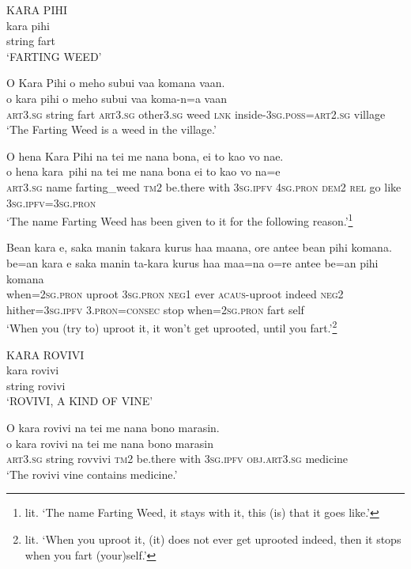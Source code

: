 \ea\label{ex:text7-60}
KARA PIHI\\
\gll kara	pihi\\
     string	fart\\
\glt `FARTING WEED'
\z

\ea\label{ex:text7-61}
O Kara Pihi o meho subui vaa komana vaan.\\
\gll o	kara	pihi	o	meho	subui	vaa	koma-n=a	vaan\\
     \textsc{art}3.\textsc{sg}	string	fart	\textsc{art}3.\textsc{sg}	other3.\textsc{sg}	weed	\textsc{lnk}	inside-3\textsc{sg}.\textsc{poss}=\textsc{art}2.\textsc{sg}	village\\
\glt `The Farting Weed is a weed in the village.'
\z

\ea\label{ex:text7-62}
O hena Kara Pihi na tei me nana bona, ei to kao vo nae.\\
\gll o	hena	kara~pihi	na	tei	me	nana	bona	ei	to	kao	vo	na=e\\
     \textsc{art}3.\textsc{sg}	name	farting\_weed	\textsc{tm}2	be.there	with	3\textsc{sg}.\textsc{ipfv}	4\textsc{sg}.\textsc{pron}	\textsc{dem}2	\textsc{rel}	go	like	3\textsc{sg}.\textsc{ipfv}=3\textsc{sg}.\textsc{pron}\\
\glt `The name Farting Weed has been given to it for the following reason.'\footnote{lit. `The name Farting Weed, it stays with it, this (is) that it goes like.'}
\z

\newpage
\ea\label{ex:text7-63}
Bean kara e, saka manin takara kurus haa maana, ore antee bean pihi komana.\\
\gll be=an	kara	e	saka	manin	ta-kara	kurus	haa	maa=na	o=re	antee	be=an	pihi	komana\\
     when=2\textsc{sg}.\textsc{pron}	uproot	3\textsc{sg}.\textsc{pron}	\textsc{neg}1	ever	\textsc{acaus}-uproot	indeed	\textsc{neg}2	hither=3\textsc{sg}.\textsc{ipfv}	3.\textsc{pron}=\textsc{consec}	stop	when=2\textsc{sg}.\textsc{pron}	fart	self\\
\glt `When you (try to) uproot it, it won’t get uprooted, until you fart.'\footnote{lit. `When you uproot it, (it) does not ever get uprooted indeed, then it stops when you fart (your)self.'}
\z

\ea\label{ex:text7-64}
KARA ROVIVI\\
\gll kara	rovivi\\
     string	rovivi\\
\glt `ROVIVI, A KIND OF VINE'
\z

\ea\label{ex:text7-65}
O kara rovivi na tei me nana bono marasin.\\
\gll o	kara	rovivi	na	tei	me	nana	bono	marasin\\
     \textsc{art}3.\textsc{sg}	string	rovvivi	\textsc{tm}2	be.there	with	3\textsc{sg}.\textsc{ipfv}	\textsc{obj}.\textsc{art}3.\textsc{sg}	medicine\\
\glt `The rovivi vine contains medicine.'
\z

